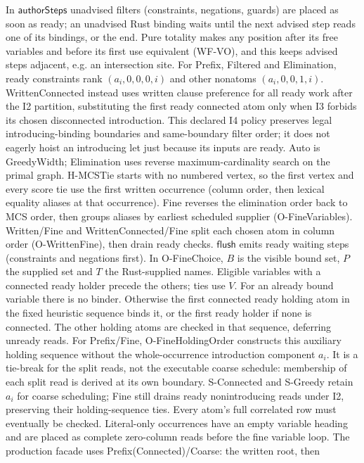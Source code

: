 In $\mathsf{authorSteps}$ unadvised filters (constraints, negations,
guards) are placed as soon as ready; an unadvised Rust binding waits until the
next advised step reads one of its bindings, or the end. Pure totality makes any
position after its free variables and before its first use equivalent (WF-VO),
and this keeps advised steps adjacent, e.g. an intersection site.
For Prefix, Filtered and Elimination, ready constraints rank
$(a_i,0,0,0,i)$ and other nonatoms $(a_i,0,0,1,i)$. WrittenConnected instead
uses written clause preference for all ready work after the I2 partition,
substituting the first ready connected atom only when I3 forbids its chosen
disconnected introduction. This declared I4 policy preserves legal
introducing-binding boundaries and same-boundary filter order; it does not
eagerly hoist an introducing let just because its inputs are ready.
Auto is GreedyWidth; Elimination uses reverse maximum-cardinality search on the
primal graph. H-MCSTie starts with no numbered vertex, so the first vertex
and every score tie use the first written occurrence (column order, then
lexical equality aliases at that occurrence). Fine reverses the elimination
order back to MCS order, then groups aliases by earliest scheduled supplier
(O-FineVariables).
Written/Fine and WrittenConnected/Fine split each chosen atom in column order
(O-WrittenFine), then drain ready checks. $\mathsf{flush}$ emits ready waiting
steps (constraints and negations first). In O-FineChoice, $B$ is the visible
bound set, $P$ the supplied set and $T$ the Rust-supplied names. Eligible
variables with a connected ready holder precede the others; ties use $V$.
For an already bound variable there is no binder. Otherwise the first
connected ready holding atom in the fixed heuristic sequence binds it,
or the first ready holder if none is connected. The other holding atoms
are checked in that sequence, deferring unready reads.
For Prefix/Fine, O-FineHoldingOrder constructs this auxiliary holding
sequence without the whole-occurrence introduction component $a_i$.
It is a tie-break for the split reads, not the executable coarse schedule:
membership of each split read is derived at its own boundary. S-Connected
and S-Greedy retain $a_i$ for coarse scheduling; Fine still drains ready
nonintroducing reads under I2, preserving their holding-sequence ties.
Every atom's full correlated row must eventually be checked.
Literal-only occurrences have an empty variable heading and
are placed as complete zero-column reads before the fine variable loop.
The production facade uses Prefix(Connected)/Coarse: the written root, then
